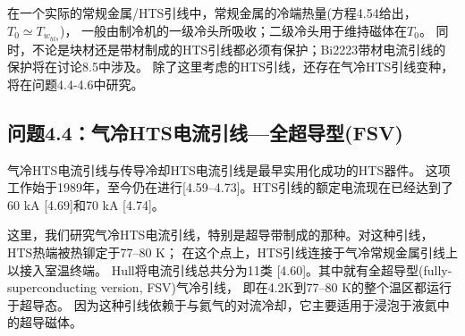 在一个实际的常规金属/HTS引线中，常规金属的冷端热量(方程4.54给出，$T_0\simeq T_{w_{hts}}$)，
一般由制冷机的一级冷头所吸收；二级冷头用于维持磁体在$T_0$。
同时，不论是块材还是带材制成的HTS引线都必须有保护；Bi2223带材电流引线的保护将在讨论8.5中涉及。
除了这里考虑的HTS引线，还存在气冷HTS引线变种，将在问题4.4-4.6中研究。


\subsection{问题4.4：气冷HTS电流引线---全超导型(FSV)}

气冷HTS电流引线与传导冷却HTS电流引线是最早实用化成功的HTS器件。
这项工作始于1989年，至今仍在进行[4.59–4.73]。HTS引线的额定电流现在已经达到了60 kA [4.69]和70 kA [4.74]。

这里，我们研究气冷HTS电流引线，特别是超导带制成的那种。对这种引线，HTS热端被热铆定于77–80 K；
在这个点上，HTS引线连接于气冷常规金属引线上以接入室温终端。
Hull将电流引线总共分为11类 [4.60]。其中就有全超导型(fully-superconducting version, FSV)气冷引线，
即在4.2K到77–80 K的整个温区都运行于超导态。
因为这种引线依赖于与氦气的对流冷却，它主要适用于浸泡于液氦中的超导磁体。

